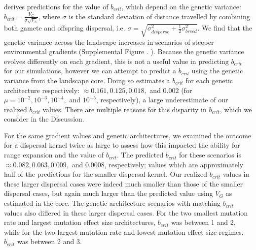 \citet{Barton:2001} derives predictions for the value of $b_{crit}$, which depend on the genetic variance: $b_{crit} = \frac{V_G}{\sigma \sqrt{V_S}}$, where $\sigma$ is the standard deviation of distance travelled by combining both gamete and offspring dispersal, i.e. $\sigma = \sqrt{\sigma_{disperse}^2 + \frac{1}{2}\sigma_{breed}^2}$. We find that the genetic variance across the landscape increases in scenarios of steeper environmental gradients (Supplemental Figure . ). Because the genetic variance evolves differently on each gradient, this is not a useful value in predicting $b_{crit}$ for our simulations, however we can attempt to predict a $b_{crit}$ using the genetic variance from the landscape core. Doing so estimates a $b_{crit}$ for each genetic architecture respectively: $\approx 0.161, 0.125, 0.018,$ and $0.002$ (for $\mu = 10^{-2}, 10^{-3}, 10^{-4},$ and $10^{-5}$, respectively), a large underestimate of our realized $b_{crit}$ values. There are multiple reasons for this disparity in $b_{crit}$, which we consider in the Discussion.

For the same gradient values and genetic architectures, we examined the outcome for a dispersal kernel twice as large to assess how this impacted the ability for range expansion and the value of $b_{crit}$. The predicted $b_{crit}$ for these scenarios is $\approx 0.082, 0.063, 0.009,$ and $0.0008$, respectively; values which are approximately half of the predictions for the smaller dispersal kernel. Our realized $b_{crit}$ values in these larger dispersal cases were indeed much smaller than those of the smaller dispersal cases, but again much larger than the predicted value using $V_G$ as estimated in the core. The genetic architecture scenarios with matching $b_{crit}$ values also differed in these larger dispersal cases. For the two smallest mutation rate and largest mutation effect size architectures, $b_{crit}$ was between 1 and 2, while for the two largest mutation rate and lowest mutation effect size regimes, $b_{crit}$ was between 2 and 3.







